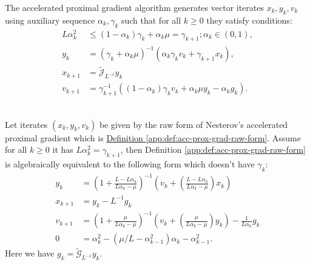 \documentclass[12pt]{article}
\begin{document}
    \begin{definition}
    \label{app:def:acc-prox-grad-raw-form}
        The accelerated proximal gradient algorithm generates vector iterates $x_k, y_k, v_k$ using auxiliary sequence $\alpha_k, \gamma_k$ such that for all $k\ge0$ they satisfy conditions: 
        \begin{align*}
            L\alpha_k^2 
            &\le 
            (1 - \alpha_k)\gamma_k + \alpha_k\mu = \gamma_{k + 1}; \alpha_k \in (0, 1), 
            \\
            y_k &= (\gamma_k + \alpha_k \mu)^{-1}
            (\alpha_k \gamma_k v_k + \gamma_{k + 1}x_k),
            \\
            x_{k + 1}&= 
            \widetilde{\mathcal J}_{L^{-1}} y_k
            \\
            v_{k + 1} &= 
            \gamma_{k + 1}^{-1}
            \left(
                (1 - \alpha_k)\gamma_k v_k + \alpha_k \mu y_k - \alpha_k g_k
            \right). 
        \end{align*}
    \end{definition}
    \begin{theorem}\label{app:theorem:acc-prox-grad-intermediate}\; \\
        Let iterates $(x_k, y_k, v_k)$ be given by the raw form of Nesterov's accelerated proximal gradient which is 
        \hyperref[app:def:acc-prox-grad-raw-form]{Definition \ref*{app:def:acc-prox-grad-raw-form}}. 
        Assume for all $k \ge 0$ it has $L\alpha_k^2 = \gamma_{k + 1}$, then Definition \ref*{app:def:acc-prox-grad-raw-form} is algebraically equivalent to the following form which doesn't have $\gamma_k$: 
        \begin{align*}
            y_k &= 
            \left(
                1 + \frac{L - L\alpha_k}{L\alpha_k - \mu}
            \right)^{-1}
            \left(
                v_k + 
                \left(\frac{L - L\alpha_k}{L\alpha_k - \mu} \right) x_k
            \right)
            \\
            x_{k + 1} &= 
            y_k - L^{-1}  g_k
            \\
            v_{k + 1} &= 
            \left(
                1 + \frac{\mu}{L \alpha_k - \mu}
            \right)^{-1}
            \left(
                v_k + 
                \left(\frac{\mu}{L \alpha_k - \mu}\right) y_k
            \right) - \frac{1}{L\alpha_{k}} g_k
            \\
            0 &= \alpha_k^2 - \left(\mu/L - \alpha_{k -1}^2\right) \alpha_k - \alpha_{k - 1}^2. 
        \end{align*}
        Here we have $g_k = \widetilde{\mathcal G}_{L^{-1}}y_k$. 
    \end{theorem}
\end{document}
